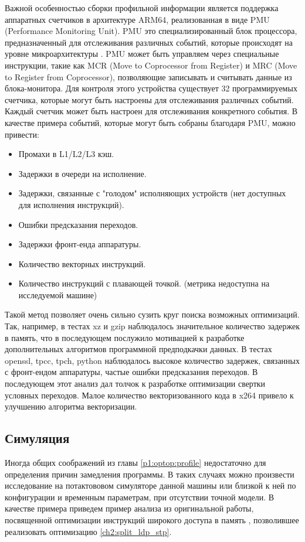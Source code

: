 Важной особенностью сборки профильной информации является поддержка аппаратных счетчиков в архитектуре ARM64, реализованная в виде PMU (Performance Monitoring Unit). PMU это специализированный блок процессора, предназначенный для отслеживания различных событий, которые происходят на уровне микроархитектуры \cite{hansen2020examining}. PMU может быть управляем через специальные инструкции, такие как MCR (Move to Coprocessor from Register) и MRC (Move to Register from Coprocessor), позволяющие записывать и считывать данные из блока-монитора. Для контроля этого устройства существует 32 программируемых счетчика, которые могут быть настроены для отслеживания различных событий. Каждый счетчик может быть настроен для отслеживания конкретного события. В качестве примера событий, которые могут быть собраны благодаря PMU, можно привести:
\begin{itemize}
	\item Промахи в L1/L2/L3 кэш.
	\item Задержки в очереди на исполнение.
	\item Задержки, связанные с "голодом"\phantom{} исполняющих устройств (нет доступных для исполнения инструкций).
	\item Ошибки предсказания переходов.
	\item Задержки фронт-енда аппаратуры.
	\item Количество векторных инструкций.
	\item Количество инструкций с плавающей точкой. (метрика недоступна на исследуемой машине)
\end{itemize}


Такой метод позволяет очень сильно сузить круг поиска возможных оптимизаций. Так, например, в тестах xz и gzip наблюдалось значительное количество задержек в память, что в последующем послужило мотивацией к разработке дополнительных алгоритмов программной предподкачки данных. В тестах openssl, tpcc, tpch, python наблюдалось высокое количество задержек, связанных с фронт-ендом аппаратуры, частые ошибки предсказания переходов. В последующем этот анализ дал толчок к разработке оптимизации свертки условных переходов. Малое количество векторизованного кода в x264 привело к улучшению алгоритма векторизации.


\subsection {Симуляция}\label{p1:optop:sim}

Иногда общих соображений из главы \ref{p1:optop:profile} недостаточно для определения причин замедления программы. В таких случаях можно произвести исследование на потактововом симуляторе данной машины или близкой к ней по конфигурации и временным параметрам, при отсутствии точной модели. В качестве примера приведем пример анализа из оригинальной работы, посвященной оптимизации инструкций широкого доступа в память \cite{chernonog2024widemem}, позволившее реализовать оптимизацию \ref{ch2:split_ldp_stp}.

